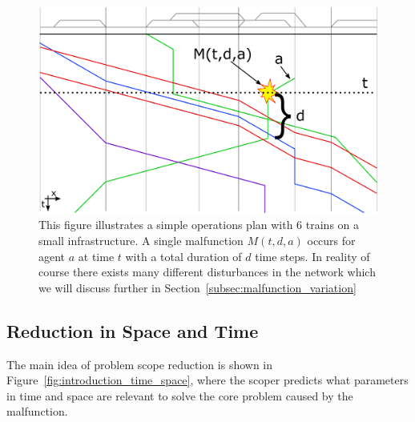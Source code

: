\documentclass{article}
\begin{document}
%
\begin{figure}[hbtp]
	\centering
  \includegraphics[width=\textwidth]{Figures/malfunction_generation.pdf}
	\caption{This figure illustrates a simple operations plan with 6 trains on a small infrastructure. A single malfunction $M(t,d,a)$ occurs for agent $a$ at time $t$ with a total duration of $d$ time steps. In reality of course there exists many different disturbances in the network which we will discuss further in Section~\ref{subsec:malfunction_variation}}
	\label{fig:introduction_no_loop}
\end{figure}

\subsection{Reduction in Space and Time}\label{subec:slicing}




The main idea of problem scope reduction is shown in Figure~\ref{fig:introduction_time_space}, where the scoper predicts what parameters in time and space are relevant to solve the core problem caused by the malfunction.
\end{document}

